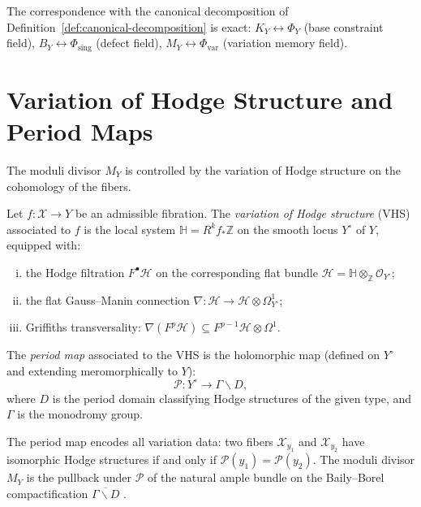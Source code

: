 \documentclass[11pt,openany]{book}
\begin{document}
\begin{remark}
The correspondence with the canonical decomposition of
Definition~\ref{def:canonical-decomposition} is exact:
$K_Y \leftrightarrow \Phi_Y$ (base constraint field),
$B_Y \leftrightarrow \Phi_{\mathrm{sing}}$ (defect field),
$M_Y \leftrightarrow \Phi_{\mathrm{var}}$ (variation
memory field).
\end{remark}

\section{Variation of Hodge Structure and Period Maps}
\label{sec:vhs}

The moduli divisor $M_Y$ is controlled by the variation of
Hodge structure on the cohomology of the fibers.

\begin{definition}
Let $f : \mathcal{X} \to Y$ be an admissible fibration.
The \emph{variation of Hodge structure} (VHS) associated
to $f$ is the local system $\mathbb{H} = R^k f_*
\mathbb{Z}$ on the smooth locus $Y^\circ$ of $Y$,
equipped with:
\begin{enumerate}[(i)]
  \item the Hodge filtration $F^\bullet \mathcal{H}$ on
    the corresponding flat bundle $\mathcal{H} =
    \mathbb{H} \otimes_{\mathbb{Z}} \mathcal{O}_{Y^\circ}$;
  \item the flat Gauss--Manin connection $\nabla :
    \mathcal{H} \to \mathcal{H} \otimes \Omega^1_{Y^\circ}$;
  \item Griffiths transversality: $\nabla(F^p\mathcal{H})
    \subseteq F^{p-1}\mathcal{H} \otimes \Omega^1$.
\end{enumerate}
\end{definition}

\begin{definition}
The \emph{period map} associated to the VHS is the
holomorphic map (defined on $Y^\circ$ and extending
meromorphically to $Y$):
\[
  \mathcal{P} : Y^\circ \to \Gamma \backslash D,
\]
where $D$ is the period domain classifying Hodge structures
of the given type, and $\Gamma$ is the monodromy group.
\end{definition}

The period map encodes all variation data: two fibers
$\mathcal{X}_{y_1}$ and $\mathcal{X}_{y_2}$ have
isomorphic Hodge structures if and only if $\mathcal{P}(y_1)
= \mathcal{P}(y_2)$.  The moduli divisor $M_Y$ is the
pullback under $\mathcal{P}$ of the natural ample bundle
on the Baily--Borel compactification $\overline{\Gamma
\backslash D}$ \citep{deligne1971, griffiths1968}.
\end{document}
